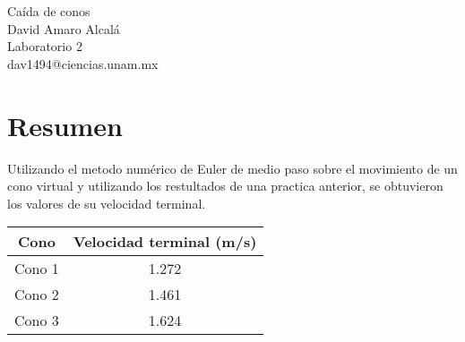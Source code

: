 \begin{center}
    {\huge Caída de conos}\\
    {\normalsize David Amaro Alcalá}\\
    {\normalsize Laboratorio 2}\\
    dav1494@ciencias.unam.mx\\
\end{center}

\section*{Resumen}

Utilizando el metodo numérico
de Euler de medio paso sobre el movimiento
de un cono virtual y utilizando los restultados
de una practica anterior, se obtuvieron los
valores de su velocidad terminal.

\begin{Tabla}
    \centering
    \begin{tabular}{|c|c|}
        \hline
        \rowcolor{azulito} Cono & Velocidad terminal (m/s) \\
        \hline Cono 1 & 1.272 \\
        \hline Cono 2 & 1.461 \\
        \hline Cono 3 & 1.624 \\
        \hline
    \end{tabular}
\end{Tabla}
